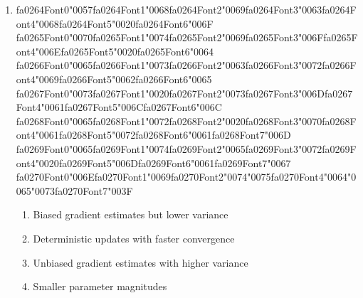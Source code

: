 \documentclass[12pt]{article}
\begin{document}
\begin{enumerate}[label=Q\arabic*.]
 \begin{enumerate}[label=(\Alph*)]
     \item Dropout disabled
     \item The input data has not been normalized
     \item All weights are initialized to zero while biases are non-zero
     \item Learning rate too high
 \end{enumerate}
 
 \item {\csname fa0264Font0\endcsname\char"0057}{\csname fa0264Font1\endcsname\char"0068}{\csname fa0264Font2\endcsname\char"0069}{\csname fa0264Font3\endcsname\char"0063}{\csname fa0264Font4\endcsname\char"0068}{\csname fa0264Font5\endcsname\char"0020}{\csname fa0264Font6\endcsname\char"006F} {\csname fa0265Font0\endcsname\char"0070}{\csname fa0265Font1\endcsname\char"0074}{\csname fa0265Font2\endcsname\char"0069}{\csname fa0265Font3\endcsname\char"006F}{\csname fa0265Font4\endcsname\char"006E}{\csname fa0265Font5\endcsname\char"0020}{\csname fa0265Font6\endcsname\char"0064} {\csname fa0266Font0\endcsname\char"0065}{\csname fa0266Font1\endcsname\char"0073}{\csname fa0266Font2\endcsname\char"0063}{\csname fa0266Font3\endcsname\char"0072}{\csname fa0266Font4\endcsname\char"0069}{\csname fa0266Font5\endcsname\char"0062}{\csname fa0266Font6\endcsname\char"0065} {\csname fa0267Font0\endcsname\char"0073}{\csname fa0267Font1\endcsname\char"0020}{\csname fa0267Font2\endcsname\char"0073}{\csname fa0267Font3\endcsname\char"006D}{\csname fa0267Font4\endcsname\char"0061}{\csname fa0267Font5\endcsname\char"006C}{\csname fa0267Font6\endcsname\char"006C} {\csname fa0268Font0\endcsname\char"0065}{\csname fa0268Font1\endcsname\char"0072}{\csname fa0268Font2\endcsname\char"0020}{\csname fa0268Font3\endcsname\char"0070}{\csname fa0268Font4\endcsname\char"0061}{\csname fa0268Font5\endcsname\char"0072}{\csname fa0268Font6\endcsname\char"0061}{\csname fa0268Font7\endcsname\char"006D} {\csname fa0269Font0\endcsname\char"0065}{\csname fa0269Font1\endcsname\char"0074}{\csname fa0269Font2\endcsname\char"0065}{\csname fa0269Font3\endcsname\char"0072}{\csname fa0269Font4\endcsname\char"0020}{\csname fa0269Font5\endcsname\char"006D}{\csname fa0269Font6\endcsname\char"0061}{\csname fa0269Font7\endcsname\char"0067} {\csname fa0270Font0\endcsname\char"006E}{\csname fa0270Font1\endcsname\char"0069}{\csname fa0270Font2\endcsname\char"0074}{\char"0075}{\csname fa0270Font4\endcsname\char"0064}{\char"0065}{\char"0073}{\csname fa0270Font7\endcsname\char"003F}
 \begin{enumerate}[label=(\Alph*)]
     \item Biased gradient estimates but lower variance
     \item Deterministic updates with faster convergence
     \item Unbiased gradient estimates with higher variance
     \item Smaller parameter magnitudes
 \end{enumerate}
 

\end{enumerate}
\end{document}
